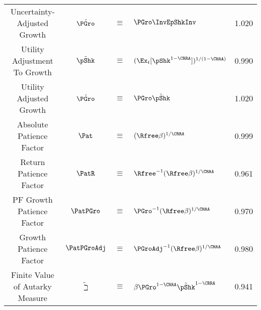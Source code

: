 \begin{table}
\begin{center}
\begin{tabular}{|c|ccl|c|}
Uncertainty-Adjusted Growth                 & $\acute{\PGro} $ & $\equiv$ & $ \PGro \InvEpShkInv$        & 1.020 \\
Utility Adjustment To Growth                & $\tilde{\pShk} $ & $\equiv$ & $ (\Ex_{t}[\pShk^{1-\CRRA}])^{1/(1-\CRRA)}$ & 0.990 \\
Utility Adjusted Growth                     & $\acute{\PGro} $ & $\equiv$ & $ \PGro \tilde{\pShk}$        & 1.020 \\
Absolute Patience Factor                    & $\Pat $ & $\equiv$ & $ (\Rfree \beta)^{1/\CRRA}$                & 0.999 \\
Return Patience Factor                      & $\PatR$ & $\equiv$ & $\Rfree^{-1}(\Rfree \beta)^{1/\CRRA} $     & 0.961 \\
PF Growth Patience Factor    & $\PatPGro$ & $\equiv$ & $\PGro^{-1}(\Rfree \beta)^{1/\CRRA} $      & 0.970 \\
Growth Patience Factor                      & $\PatPGroAdj$ & $\equiv$ & $ \PGroAdj^{-1}(\Rfree \beta)^{1/\CRRA}$& 0.980 \\
Finite Value of Autarky Measure         & $\tilde{\beth} $ & $\equiv$ & $ \beta \PGro^{1-\CRRA}\tilde{\pShk}^{1-\CRRA}$       & 0.941 \\ \hline
\end{tabular}
\end{center}
\end{table}

